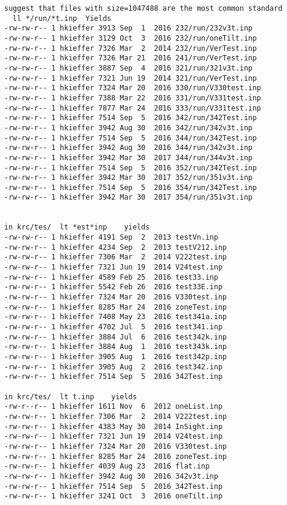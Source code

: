 \documentclass{article}
\begin{document}
\begin{verbatim}
suggest that files with size=1047488 are the most common standard
  ll */run/*t.inp  Yields
-rw-rw-r-- 1 hkieffer 3913 Sep  1  2016 232/run/232v3t.inp
-rw-rw-r-- 1 hkieffer 3129 Oct  3  2016 232/run/oneTilt.inp
-rw-rw-r-- 1 hkieffer 7326 Mar  2  2014 232/run/VerTest.inp
-rw-rw-r-- 1 hkieffer 7326 Mar 21  2016 241/run/VerTest.inp
-rw-rw-r-- 1 hkieffer 3887 Sep  4  2016 321/run/321v3t.inp
-rw-rw-r-- 1 hkieffer 7321 Jun 19  2014 321/run/VerTest.inp
-rw-rw-r-- 1 hkieffer 7324 Mar 20  2016 330/run/V330test.inp
-rw-rw-r-- 1 hkieffer 7388 Mar 22  2016 331/run/V331test.inp
-rw-rw-r-- 1 hkieffer 7877 Mar 24  2016 333/run/V331test.inp
-rw-rw-r-- 1 hkieffer 7514 Sep  5  2016 342/run/342Test.inp
-rw-rw-r-- 1 hkieffer 3942 Aug 30  2016 342/run/342v3t.inp
-rw-rw-r-- 1 hkieffer 7514 Sep  5  2016 344/run/342Test.inp
-rw-rw-r-- 1 hkieffer 3942 Aug 30  2016 344/run/342v3t.inp
-rw-rw-r-- 1 hkieffer 3942 Mar 30  2017 344/run/344v3t.inp
-rw-rw-r-- 1 hkieffer 7514 Sep  5  2016 352/run/342Test.inp
-rw-rw-r-- 1 hkieffer 3942 Mar 30  2017 352/run/351v3t.inp
-rw-rw-r-- 1 hkieffer 7514 Sep  5  2016 354/run/342Test.inp
-rw-rw-r-- 1 hkieffer 3942 Mar 30  2017 354/run/351v3t.inp

 
in krc/tes/  lt *est*inp    yields
-rw-rw-r-- 1 hkieffer 4191 Sep  2  2013 testVn.inp
-rw-rw-r-- 1 hkieffer 4234 Sep  2  2013 testV212.inp
-rw-rw-r-- 1 hkieffer 7306 Mar  2  2014 V222test.inp
-rw-rw-r-- 1 hkieffer 7321 Jun 19  2014 V24test.inp
-rw-rw-r-- 1 hkieffer 4589 Feb 25  2016 test33.inp
-rw-rw-r-- 1 hkieffer 5542 Feb 26  2016 test33E.inp
-rw-rw-r-- 1 hkieffer 7324 Mar 20  2016 V330test.inp
-rw-rw-r-- 1 hkieffer 8285 Mar 24  2016 zoneTest.inp
-rw-rw-r-- 1 hkieffer 7408 May 23  2016 test341a.inp
-rw-rw-r-- 1 hkieffer 4702 Jul  5  2016 test341.inp
-rw-rw-r-- 1 hkieffer 3884 Jul  6  2016 test342k.inp
-rw-rw-r-- 1 hkieffer 3884 Aug  1  2016 test343k.inp
-rw-rw-r-- 1 hkieffer 3905 Aug  1  2016 test342p.inp
-rw-rw-r-- 1 hkieffer 3905 Aug  2  2016 test342.inp
-rw-rw-r-- 1 hkieffer 7514 Sep  5  2016 342Test.inp

in krc/tes/  lt t.inp    yields
-rw-r--r-- 1 hkieffer 1611 Nov  6  2012 oneList.inp
-rw-rw-r-- 1 hkieffer 7306 Mar  2  2014 V222test.inp
-rw-rw-r-- 1 hkieffer 4383 May 30  2014 InSight.inp
-rw-rw-r-- 1 hkieffer 7321 Jun 19  2014 V24test.inp
-rw-rw-r-- 1 hkieffer 7324 Mar 20  2016 V330test.inp
-rw-rw-r-- 1 hkieffer 8285 Mar 24  2016 zoneTest.inp
-rw-rw-r-- 1 hkieffer 4039 Aug 23  2016 flat.inp
-rw-rw-r-- 1 hkieffer 3942 Aug 30  2016 342v3t.inp
-rw-rw-r-- 1 hkieffer 7514 Sep  5  2016 342Test.inp
-rw-rw-r-- 1 hkieffer 3241 Oct  3  2016 oneTilt.inp
\end{verbatim}  

\appendix %
\end{document}
